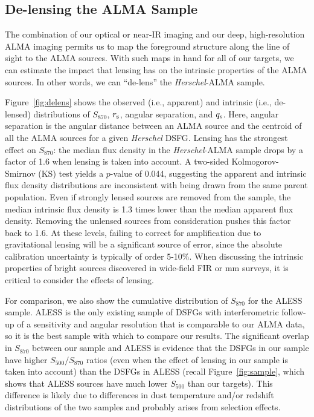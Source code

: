 \documentclass[iop]{emulateapj}
\begin{document}
\subsection{De-lensing the ALMA Sample}\label{sec:lensing}

The combination of our optical or near-IR imaging and our deep, high-resolution
ALMA imaging permits us to map the foreground structure along the line of sight
to the ALMA sources.  With such maps in hand for all of our targets, we can
estimate the impact that lensing has on the intrinsic properties of the ALMA
sources.  In other words, we can ``de-lens'' the {\it Herschel}-ALMA sample.

Figure~\ref{fig:delens} shows the observed (i.e., apparent) and intrinsic
(i.e., de-lensed) distributions of $S_{870}$, $r_{\rm s}$, angular separation,
and $q_{\rm s}$.  Here, angular separation is the angular distance between an
ALMA source and the centroid of all the ALMA sources for a given {\it Herschel}
DSFG.  Lensing has the strongest effect on $S_{870}$: the median flux density
in the {\it Herschel}-ALMA sample drops by a factor of 1.6 when lensing is
taken into account. A two-sided Kolmogorov-Smirnov (KS) test yields a $p$-value
of 0.044, suggesting the apparent and intrinsic flux density distributions are
inconsistent with being drawn from the same parent population.  Even if
strongly lensed sources are removed from the sample, the median intrinsic flux
density is 1.3 times lower than the median apparent flux density.  Removing the
unlensed sources from consideration pushes this factor back to 1.6.  At these
levels, failing to correct for amplification due to gravitational lensing will
be a significant source of error, since the absolute calibration uncertainty is
typically of order 5-10\%.  When discussing the intrinsic properties of bright
sources \citep[including their number counts, e.g.][]{Wyithe:2011rm}
discovered in wide-field FIR or mm surveys, it is critical to consider the
effects of lensing.

For comparison, we also show the cumulative distribution of $S_{870}$ for the
ALESS sample.  ALESS is the only existing sample of DSFGs with interferometric
follow-up of a sensitivity and angular resolution that is comparable to our
ALMA data, so it is the best sample with which to compare our results.  The
significant overlap in $S_{870}$ between our sample and ALESS is evidence that
the DSFGs in our sample have higher $S_{500}/S_{870}$ ratios (even when the
effect of lensing in our sample is taken into account) than the DSFGs in ALESS
(recall Figure~\ref{fig:sample}, which shows that ALESS sources have much lower
$S_{500}$ than our targets).  This difference is likely due to differences in
dust temperature and/or redshift distributions of the two samples and probably
arises from selection effects.
\end{document}
